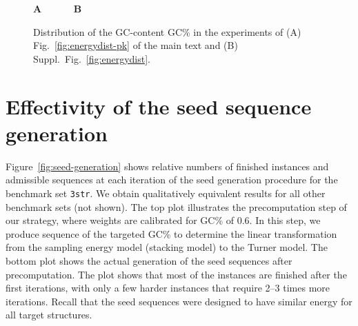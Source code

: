 \documentclass[10pt]{article}
\makeatletter
\newlength{\@aligneps}
\newcommand{\includegraphicstop}[2][]{%
\sbox{\@alignepsbox}{\texttt{[image: \#2]}}%
\setlength{\@aligneps}{-\ht\@alignepsbox}%
\addtolength{\@aligneps}{2ex}%
\raisebox{\@aligneps}{\usebox{\@alignepsbox}}}
\newcommand{\Nuc}[1]{{\sf #1}}
\newcommand{\Cb}{\Nuc{C}}
\newcommand{\Gb}{\Nuc{G}}
\newcommand{\GCb}{\Gb\Cb}
\newenvironment{revision}{\color{red}}{\color{black}}
\makeatother
\begin{document}
\begin{figure}[h!]
  \begin{center}
    {\sf \bfseries A}~\includegraphicstop[width=0.45\textwidth]{Figs/Plots/PKB00211_PKB00239_0_GC_content}
    ~~~~~{\sf \bfseries B}~\includegraphicstop[width=0.45\textwidth]{Figs/Plots/supp_3str_GC_content}
  \end{center}
  \caption{Distribution of the \GCb-content \GCb\% in the experiments of (A) Fig.~\ref{fig:energydist-pk} of the main text and (B) Suppl.~Fig.~\ref{fig:energydist}.}
  \label{fig:gc-content}
\end{figure}

\begin{revision}
\section{Effectivity of the seed sequence generation}
Figure~\ref{fig:seed-generation} shows relative numbers of finished instances and admissible sequences at each iteration of the seed generation procedure for the benchmark set \texttt{3str}. We obtain qualitatively equivalent results for all other benchmark sets (not shown). The top plot illustrates the  precomputation step of our strategy, where weights are calibrated for \GCb\% of 0.6. In this step, we produce sequence of the targeted \GCb\% to determine the linear transformation from the sampling energy model (stacking model) to the Turner model. The bottom plot shows the actual generation of the seed sequences after precomputation. The plot shows that most of the instances are finished after the first iterations, with only a few harder instances that require 2--3 times more iterations. Recall that the seed sequences were designed to have similar energy for all target structures.


\end{revision}
\end{document}
